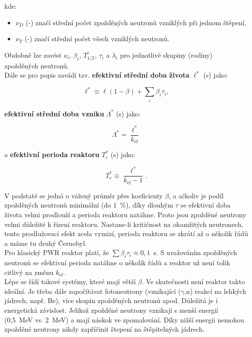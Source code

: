 kde:

\begin{itemize}
  \item $\nu_D$ (-) značí střední počet zpožděných neutronů vzniklých při jednom štěpení,
  \item $\nu_T$ (-) značí střední počet všech vzniklých neutronů.
\end{itemize}

Obdobně lze zavést $\nu_i$, $\beta_i$, $T_{1/2}^i$, $\tau_i$ a $\lambda_i$ pro jednotlivé skupiny (rodiny) zpožděných neutronů.\\

Dále se pro popis zavádí tzv. \textbf{efektivní střední doba života} $\ell^*$ (s) jako:

\begin{equation}
  \boxed{
  \ell^* \equiv \ell(1-\beta) + \sum_i \beta_i \tau_i,
  \label{efektivni_stredni_doba_zivota}}
\end{equation}

\textbf{efektivní střední doba vzniku} $\Lambda^*$ (s) jako:

\begin{equation}
  \boxed{
  \Lambda^* = \dfrac{\ell^*}{k_{\text{ef}}}
  \label{efektivni_stredni_doba_vzniku}}
\end{equation}

a \textbf{efektivní perioda reaktoru} $T_e^*$ (s) jako:

\begin{equation}
  \boxed{
  T_e^* \equiv \dfrac{\ell^*}{k_{\text{ef}} - 1}.
  \label{efektivni_perioda}}
\end{equation}

V podstatě se jedná o vážený průměr přes koeficienty $\beta$, a ačkoliv je podíl zpožděných neutronů minimální (do 1~\%), díky dlouhým $\tau$ se efektivní doba života velmi prodlouží a perioda reaktoru natáhne. Proto jsou zpožděné neutrony velmi důležité k řízení reaktoru. Nastane-li kritičnost na okamžitých neutronech, tento prodlužovací efekt zcela vymizí, perioda reaktoru se zkrátí až o několik řádů a máme tu druhý Černobyl.\\

Pro klasický PWR reaktor platí, že $\sum \beta_i \tau_i \approx 0,1$~s. S uvažováním zpožděných neutronů se efektivní perioda natáhne o několik řádů a reaktor už není tolik citlivý na změnu $k_{\text{ef}}$.\\

Lépe se řídí takové systémy, které mají větší $\beta$. Ve skutečnosti není reaktor takto ideální. Je třeba dále započítávat fotoneutrony (vznikající ($\gamma$,n) reakcí na lehkých jádrech, např. Be), více skupin zpožděných neutronů apod. Důležitá je i energetická závislost. Jelikož zpožděné neutrony vznikají s menší energií (0,5~MeV vs. 2~MeV) a mají náskok ve zpomalování. Díky nižší energii nemohou zpožděné neutrony nikdy zapříčinit štepení na štěpitelných jádrech.\\

